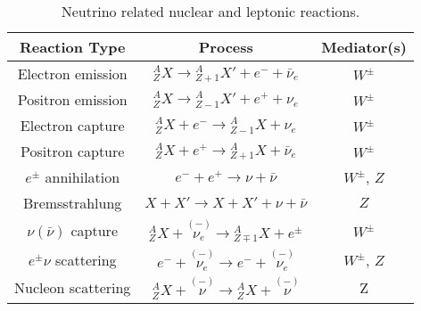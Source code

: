 \begin{table}[ht]
\centering
 \begin{tabular}{|c | c | c|}
 \hline
 Reaction Type & Process & Mediator(s)   \\ [0.5ex]
 \hline
 Electron emission & ${}^A_Z X \to {}^A_{Z+1}X' + e^- +\bar \nu_e$ & $W^{\pm}$  \\
 Positron emission & ${}^A_Z X \to {}^A_{Z-1}X' + e^+ + \nu_e$ & $W^{\pm}$  \\
 Electron capture & ${}^A_Z X + e^- \to {}^A_{Z-1}X  + \nu_e$ &  $W^{\pm}$ \\
 Positron capture & ${}^A_Z X + e^+ \to {}^A_{Z+1}X  + \bar\nu_e$ &  $W^{\pm}$ \\
 [0.5ex]
 \hline

 $e^{\pm}$ annihilation &  $e^- + e^+  \to \nu + \bar\nu $  & $W^{\pm}$, $Z$ \\
 Bremsstrahlung & $X+X' \to X + X' + \nu + \bar\nu$ & $Z$ \\
 [0.5ex]
 \hline

  $\nu (\bar\nu)$ capture & ${}^A_{Z}X + \overset{(-)}{\nu_e} \to {}^A_{Z\mp 1}X + e^\pm $ & $W^{\pm}$\\
  [1ex]
 \hline
 $e^\pm\nu$ scattering & $e^- + \overset{(-)}{\nu_e} \to e^- + \overset{(-)}{\nu_e} $ &  $W^{\pm}$, $Z$ \\
 Nucleon scattering & $ {}^A_Z X + \overset{(-)}{\nu} \to {}^A_Z X + \overset{(-)}{\nu} $ &  Z\\
 [0.5ex]
 \hline
 \end{tabular}
 \caption{Neutrino related nuclear and leptonic reactions.}
\label{table:Neutrino_Reactions}
\end{table}


